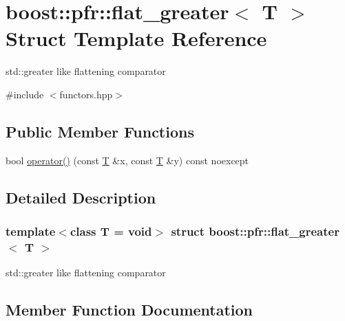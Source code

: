 \hypertarget{structboost_1_1pfr_1_1flat__greater}{}\section{boost\+:\+:pfr\+:\+:flat\+\_\+greater$<$ T $>$ Struct Template Reference}
\label{structboost_1_1pfr_1_1flat__greater}


std\+::greater like flattening comparator  




{\ttfamily \#include $<$functors.\+hpp$>$}

\subsection*{Public Member Functions}
\begin{DoxyCompactItemize}
\item 
bool \mbox{\hyperlink{structboost_1_1pfr_1_1flat__greater_abfe7d58a035a68349e6c721a1cd21973}{operator()}} (const \mbox{\hyperlink{struct_t}{T}} \&x, const \mbox{\hyperlink{struct_t}{T}} \&y) const noexcept
\end{DoxyCompactItemize}


\subsection{Detailed Description}
\subsubsection*{template$<$class T = void$>$\newline
struct boost\+::pfr\+::flat\+\_\+greater$<$ T $>$}

std\+::greater like flattening comparator 

\subsection{Member Function Documentation}
\mbox{\label{structboost_1_1pfr_1_1flat__greater_abfe7d58a035a68349e6c721a1cd21973}} 
